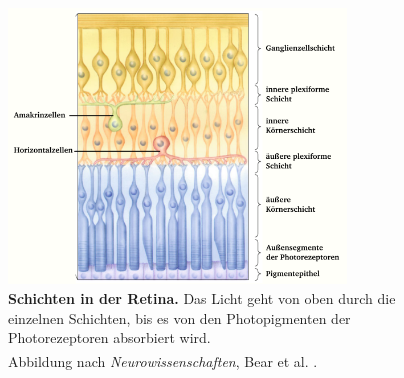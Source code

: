 \begin{figure}[H]
    \centering
    \includegraphics[width = 0.8\textwidth]{pictures/visual/retina.png}
    \caption[Schichten in der Retina]{\textbf{Schichten in der Retina.} Das Licht geht von oben durch die einzelnen Schichten, bis es von den Photopigmenten der Photorezeptoren absorbiert wird. \\
    Abbildung nach \textit{Neurowissenschaften}, Bear et al. \textsuperscript{\cite[Kap.~10]{neurowissenschaften_baer}}.}
    \label{fig:retina}
\end{figure}

